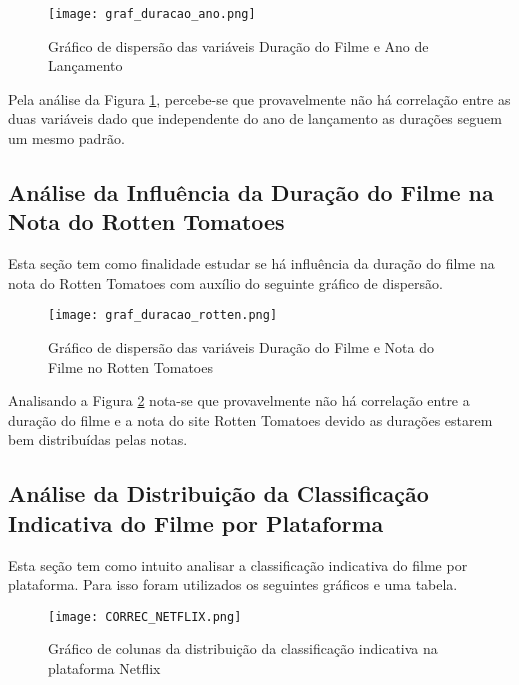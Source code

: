 \documentclass[a4paper, 12pt]{article} %
\begin{document}
\begin{figure}[H]
\cantering
\caption{Gráfico de dispersão das variáveis Duração do Filme e Ano de Lançamento}
\label{box_uni1}
\texttt{[image: graf\_duracao\_ano.png]}
\end{figure}





Pela análise da Figura \ref{box_uni1}, percebe-se que provavelmente não há correlação entre as duas variáveis dado que independente do ano de lançamento as durações seguem um mesmo padrão.


\subsection{Análise da Influência da Duração do Filme na Nota do Rotten Tomatoes}

Esta seção tem como finalidade estudar se há influência da duração do filme na nota do Rotten Tomatoes com auxílio do seguinte gráfico de dispersão.

\begin{figure}[H]
\cantering
\caption{Gráfico de dispersão das variáveis Duração do Filme e Nota do Filme no Rotten Tomatoes}
\label{box_uni2}
\texttt{[image: graf\_duracao\_rotten.png]}
\end{figure}

Analisando a Figura \ref{box_uni2} nota-se que provavelmente não há correlação entre a duração do filme e a nota do site Rotten Tomatoes devido as durações estarem bem distribuídas pelas notas. 




\subsection{Análise da Distribuição da Classificação Indicativa do Filme por Plataforma}

Esta seção tem como intuito analisar a classificação indicativa do filme por plataforma. Para isso foram utilizados os seguintes gráficos e uma tabela.






\begin{figure}[H]
\cantering
\caption{Gráfico de colunas da distribuição da classificação indicativa na plataforma Netflix}
\label{box_uni3}
\texttt{[image: CORREC\_NETFLIX.png]}
\end{figure}
\end{document}
